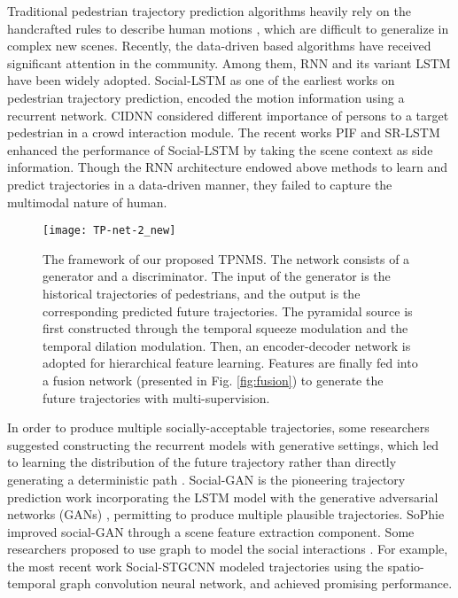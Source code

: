 \documentclass[letterpaper]{article} \usepackage{aaai21}  \usepackage{times}  \usepackage{helvet} \usepackage{courier}  \usepackage[hyphens]{url}  \usepackage{graphicx} \urlstyle{rm} \def\UrlFont{\rm}  \usepackage{natbib}  \usepackage{caption} \frenchspacing  \setlength{\pdfpagewidth}{8.5in}  \setlength{\pdfpageheight}{11in}
\begin{document}
Traditional pedestrian trajectory prediction algorithms heavily rely on the handcrafted rules to describe human motions \cite{helbing1995social,pellegrini2009you}, which are difficult to generalize in complex new scenes.
Recently, the data-driven based algorithms have received significant attention in the community. Among them, RNN and its variant LSTM have been widely adopted. Social-LSTM \cite{alahi2016social} as one of the earliest works on pedestrian trajectory prediction, encoded the motion information using a recurrent network. CIDNN \cite{xu2018encoding} considered different importance of persons to a target pedestrian in a crowd interaction module. The recent works PIF \cite{liang2019peeking} and  SR-LSTM \cite{zhang2019sr} enhanced the performance of Social-LSTM by taking the scene context as side information. Though the RNN architecture endowed above methods to learn and predict trajectories in a data-driven manner, they failed to capture the multimodal nature of human.

\begin{figure*}[!t]
	\centering
	\texttt{[image: TP-net-2\_new]}
	\caption{The framework of our proposed TPNMS. The network consists of a generator and a discriminator. The input of the generator is the historical trajectories of pedestrians, and the output is the corresponding predicted future trajectories. The pyramidal source is first constructed through the temporal squeeze modulation and the temporal dilation modulation. Then, an encoder-decoder network is adopted for hierarchical feature learning. Features are finally fed into a fusion network (presented in Fig. \ref{fig:fusion}) to generate the future trajectories with multi-supervision.}
	\label{fig:framework}
\end{figure*}

In order to produce multiple socially-acceptable trajectories, some researchers suggested constructing the recurrent models with generative settings, which led to learning the distribution of the future trajectory rather than directly generating a deterministic path \cite{gupta2018social, van2019safecritic, Li2019IROS, zhao2019multi}. Social-GAN \cite{gupta2018social} is the pioneering trajectory prediction work incorporating the LSTM model with the generative adversarial networks (GANs) \cite{goodfellow2014generative}, permitting to produce multiple plausible trajectories. SoPhie \cite{sadeghian2019sophie} improved social-GAN through a scene feature extraction component. 
Some researchers proposed to use graph to model the social interactions \cite{ ma2019trafficpredict, vemula2018social,socialbigat2019,huang2019stgat, ivanovic2019trajectron,shi2020AAAI, mohamed2020social}. For example, the most recent work Social-STGCNN \cite{mohamed2020social} modeled trajectories using the spatio-temporal graph convolution neural network, and achieved promising performance. 
\end{document}
